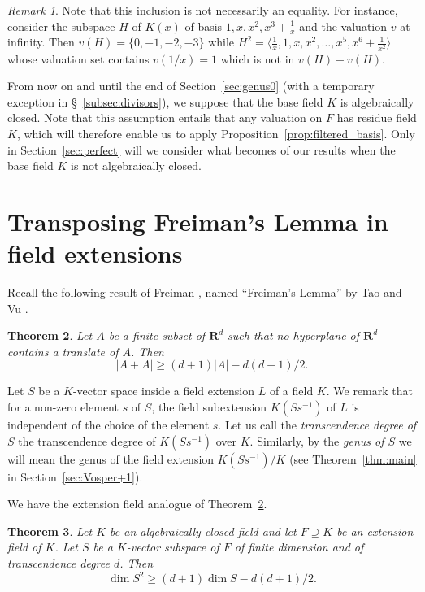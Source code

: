 \documentclass{article}
\theoremstyle{plain}
\newtheorem{thm}{Theorem}[section]
\theoremstyle{definition}
\theoremstyle{remark}
\newtheorem{rema}[thm]{Remark}
\def\R{{\mathbf R}}
\renewcommand{\geq}{\geqslant}
\begin{document}
\begin{rema}
Note that this inclusion is not necessarily an equality. For instance,
consider the subspace $H$ of $K(x)$ of basis
$1, x, x^2, x^3 + \frac 1 x$ and the valuation $v$ at infinity. Then
$v(H) = \{0,-1,-2,-3\}$ while
$H^2 = \langle \frac 1 x, 1, x, x^2, \ldots, x^5, x^6+\frac 1 {x^2}
\rangle$
whose valuation set contains $v(1/x) = 1$ which is not in $v(H)+v(H)$.  
\end{rema}

{From now on and
  until the end of Section~\ref{sec:genus0} (with a temporary exception in
  \S~\ref{subsec:divisors}), we suppose that the base field $K$
  is algebraically closed. Note that this assumption entails that any valuation on $F$
  has residue field $K$, which will therefore enable us to apply
  Proposition~\ref{prop:filtered_basis}. 
Only in Section~\ref{sec:perfect} will we consider what becomes of our
results when the base field $K$ is not algebraically closed.
}

\section{Transposing Freiman's Lemma in field extensions}
\label{sec:freiman}
Recall the following result of Freiman \cite{Freiman}, named
``Freiman's Lemma'' by Tao and Vu \cite[Lemma 5.13]{TaoVu}.

\begin{thm}\label{thm:freiman}
  Let $A$ be a finite subset of $\R^d$ such that no hyperplane of
  $\R^d$ contains a translate of $A$. Then 
  $$|A+A| \geq (d+1)|A| -d(d+1)/2.$$
\end{thm}

Let $S$ be a $K$-vector space inside a field extension $L$ of a field $K$.
We remark that for a non-zero element $s$ of $S$, the field
subextension $K(Ss^{-1})$ of $L$ is independent of the choice of the
element $s$. Let us call the {\em transcendence degree of $S$} the
transcendence degree of $K(Ss^{-1})$ over $K$. Similarly, by the {\em
  genus of $S$} we will mean the genus of the field extension
$K(Ss^{-1})/K$
(see Theorem~\ref{thm:main} in Section~\ref{sec:Vosper+1}).

We have the extension field analogue of Theorem~\ref{thm:freiman}.


\begin{thm}\label{thm:freiman_field}
  Let $K$ be {an algebraically closed}
  field and let $F \supseteq K$ be
  an extension field of $K$. Let $S$ be a $K$-vector
  subspace of $F$ of finite dimension and of transcendence degree $d$.
  Then
  $$\dim S^2\geq (d+1)\dim S -d(d+1)/2.$$
\end{thm}
\end{document}
